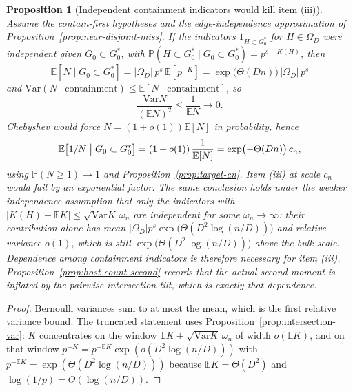 \documentclass[11pt]{article}
\newtheorem{proposition}[theorem]{Proposition}
\newcommand{\EE}{\mathbb{E}}
\newcommand{\PP}{\mathbb{P}}
\newcommand{\Var}{\mathrm{Var}}
\begin{document}
\begin{proposition}[Independent containment indicators would kill item (iii)]
\label{prop:indep-indicators-kill}
Assume the contain-first hypotheses and the edge-independence approximation
of Proposition~\ref{prop:near-disjoint-miss}.
If the indicators \(1_{H\subset G^*_0}\) for \(H\in\Omega_D\) were independent
given \(G_0\subset G^*_0\), with
\(\PP(H\subset G^*_0\mid G_0\subset G^*_0)=p^{s-K(H)}\), then
\[
\EE[N\mid G_0\subset G^*_0]
=
\lvert\Omega_D\rvert\,p^{s}\,\EE[p^{-K}]
=
\exp\bigl(\Theta(Dn)\bigr)\,\lvert\Omega_D\rvert\,p^{s}
\]
and \(\Var(N\mid\text{containment})\le\EE[N\mid\text{containment}]\), so
\[
\frac{\Var N}{(\EE N)^2}
\le
\frac{1}{\EE N}
\to 0.
\]
Chebyshev would force \(N=(1+o(1))\EE[N]\) in probability, hence
\[
\EE\bigl[1/N\bigm|G_0\subset G^*_0\bigr]
=
(1+o(1))\,\frac{1}{\EE[N]}
=
\exp\bigl(-\Theta(Dn)\bigr)\,c_n,
\]
using \(\PP(N\ge 1)\to 1\) and Proposition~\ref{prop:target-cn}.
Item (iii) at scale \(c_n\) would fail by an exponential factor.
The same conclusion holds under the weaker independence assumption that only
the indicators with \(\lvert K(H)-\EE K\rvert\le\sqrt{\Var K}\,\omega_n\) are
independent for some \(\omega_n\to\infty\): their contribution alone has mean
\(\lvert\Omega_D\rvert p^{s}\exp\bigl(\Theta(D^2\log(n/D))\bigr)\) and relative
variance \(o(1)\), which is still \(\exp\bigl(\Theta(D^2\log(n/D))\bigr)\) above
the bulk scale.
Dependence among containment indicators is therefore necessary for item (iii).
Proposition~\ref{prop:host-count-second} records that the actual second moment
is inflated by the pairwise intersection tilt, which is exactly that
dependence.
\end{proposition}

\begin{proof}
Bernoulli variances sum to at most the mean, which is the first relative
variance bound.
The truncated statement uses Proposition~\ref{prop:intersection-var}: \(K\)
concentrates on the window \(\EE K\pm\sqrt{\Var K}\,\omega_n\) of width
\(o(\EE K)\), and on that window \(p^{-K}=p^{-\EE K}\exp(o(D^2\log(n/D)))\) with
\(p^{-\EE K}=\exp(\Theta(D^2\log(n/D)))\) because
\(\EE K=\Theta(D^2)\) and \(\log(1/p)=\Theta(\log(n/D))\).
\end{proof}
\end{document}
